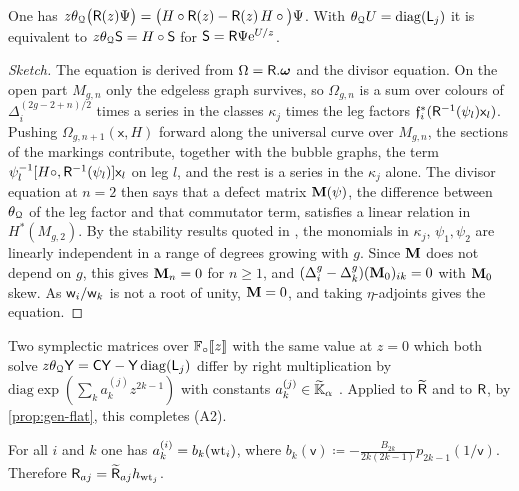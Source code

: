 \begin{prop}
\label{prop:gen-flat}
One has
$z\theta_{\mathcal{Q}}\big(\mathsf{R}(z)\Psi\big)=\big(H\circ\mathsf{R}(z)-\mathsf{R}(z)\,H\circ\big)\Psi$.
With $\theta_{\mathcal{Q}} U=\mathrm{diag}(\mathsf{L}_j)$ it is equivalent to $z\theta_{\mathcal{Q}}\mathsf{S}=H\circ\mathsf{S}$ for $\mathsf{S}=\mathsf{R}\Psi\mathrm{e}^{U/z}$.
\end{prop}

\begin{proof}[Sketch]
The equation is derived from $\Omega=\mathsf{R}.\boldsymbol{\omega}$ and the divisor equation. On the open part $M_{g,n}$ only the edgeless graph survives, so $\Omega_{g,n}$ is a sum over colours of $\Delta_i^{(2g-2+n)/2}$ times a series in the classes $\kappa_j$ times the leg factors $\mathfrak{f}_i^*(\mathsf{R}^{-1}(\psi_l)\mathsf{x}_l)$. Pushing $\Omega_{g,n+1}(\mathsf{x},H)$ forward along the universal curve over $M_{g,n}$, the sections of the markings contribute, together with the bubble graphs, the term $\psi_l^{-1}[H\circ,\mathsf{R}^{-1}(\psi_l)]\mathsf{x}_l$ on leg $l$, and the rest is a series in the $\kappa_j$ alone. The divisor equation at $n=2$ then says that a defect matrix $\mathbf{M}(\psi)$, the difference between $\theta_{\mathcal{Q}}$ of the leg factor and that commutator term, satisfies a linear relation in $H^*(M_{g,2})$. By the stability results quoted in \cite[2.17--2.19, (2.15)]{Tel12}, the monomials in $\kappa_j$, $\psi_1,\psi_2$ are linearly independent in a range of degrees growing with $g$. Since $\mathbf{M}$ does not depend on $g$, this gives $\mathbf{M}_n=0$ for $n\geq1$, and $(\Delta_i^g-\Delta_k^g)(\mathbf{M}_0)_{ik}=0$ with $\mathbf{M}_0$ skew. As $\mathsf{w}_i/\mathsf{w}_k$ is not a root of unity, $\mathbf{M}=0$, and taking $\eta$-adjoints gives the equation.
\end{proof}

Two symplectic matrices over $\mathbb{F}_{\circ}[\![ z ]\!]$ with the same value at $z=0$ which both solve $z\theta_{\mathcal{Q}}\mathsf{Y}=\mathsf{C}\mathsf{Y}-\mathsf{Y}\,\mathrm{diag}(\mathsf{L}_j)$ differ by right multiplication by $\mathrm{diag}\exp(\sum_ka_k^{(j)}z^{2k-1})$ with constants $a_k^{(j)}\in\widetilde{\mathbb{K}}_{\alpha}$ . Applied to $\widetilde{\mathsf{R}}$ and to $\mathsf{R}$, by \cref{prop:gen-flat}, this completes \textup{(A2)}.

\begin{thm}
\label{thm:gen-const}
For all $i$ and $k$ one has $a_k^{(i)}=b_k(\mathrm{wt}_i)$, where $b_k(\mathsf{v})\coloneqq-\frac{B_{2k}}{2k(2k-1)}p_{2k-1}(1/\mathsf{v})$. Therefore $\mathsf{R}_{aj}=\widetilde{\mathsf{R}}_{aj}h_{\mathrm{wt}_j}$.
\end{thm}

